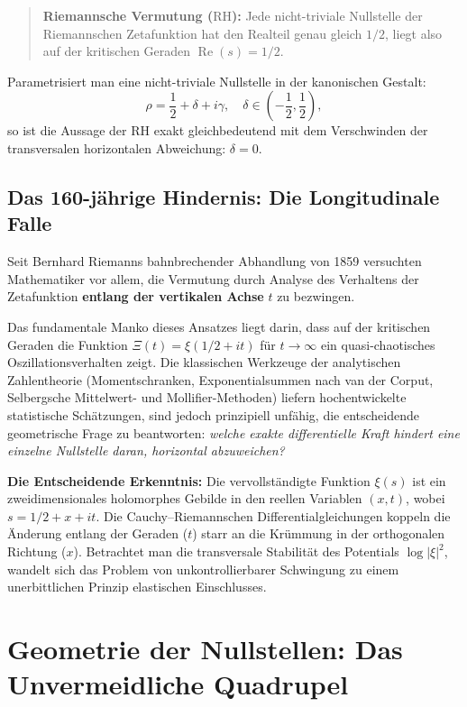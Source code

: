 \documentclass[11pt,a4paper]{article}
\theoremstyle{definition}
\theoremstyle{remark}
\begin{document}
\begin{quote}
\textbf{Riemannsche Vermutung ($\mathrm{RH}$):} Jede nicht-triviale Nullstelle der Riemannschen Zetafunktion hat den Realteil genau gleich $1/2$, liegt also auf der kritischen Geraden $\operatorname{Re}(s) = 1/2$.
\end{quote}

Parametrisiert man eine nicht-triviale Nullstelle in der kanonischen Gestalt:
\begin{equation}
\rho = \frac{1}{2} + \delta + i\gamma, \quad \delta \in \left(-\frac{1}{2}, \frac{1}{2}\right),
\end{equation}
so ist die Aussage der $\mathrm{RH}$ exakt gleichbedeutend mit dem Verschwinden der transversalen horizontalen Abweichung: $\delta = 0$.

\subsection{Das 160-jährige Hindernis: Die Longitudinale Falle}
Seit Bernhard Riemanns bahnbrechender Abhandlung von 1859 versuchten Mathematiker vor allem, die Vermutung durch Analyse des Verhaltens der Zetafunktion \textbf{entlang der vertikalen Achse} $t$ zu bezwingen.

Das fundamentale Manko dieses Ansatzes liegt darin, dass auf der kritischen Geraden die Funktion $\Xi(t) = \xi(1/2 + it)$ für $t \to \infty$ ein quasi-chaotisches Oszillationsverhalten zeigt. Die klassischen Werkzeuge der analytischen Zahlentheorie (Momentschranken, Exponentialsummen nach van der Corput, Selbergsche Mittelwert- und Mollifier-Methoden) liefern hochentwickelte statistische Schätzungen, sind jedoch prinzipiell unfähig, die entscheidende geometrische Frage zu beantworten: \emph{welche exakte differentielle Kraft hindert eine einzelne Nullstelle daran, horizontal abzuweichen?}

\textbf{Die Entscheidende Erkenntnis:} Die vervollständigte Funktion $\xi(s)$ ist ein zweidimensionales holomorphes Gebilde in den reellen Variablen $(x, t)$, wobei $s = 1/2 + x + it$. Die Cauchy--Riemannschen Differentialgleichungen koppeln die Änderung entlang der Geraden ($t$) starr an die Krümmung in der orthogonalen Richtung ($x$). Betrachtet man die transversale Stabilität des Potentials $\log |\xi|^2$, wandelt sich das Problem von unkontrollierbarer Schwingung zu einem unerbittlichen Prinzip elastischen Einschlusses.

\section{Geometrie der Nullstellen: Das Unvermeidliche Quadrupel}
\end{document}
